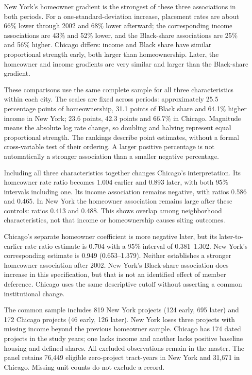 \documentclass[11pt]{article}
\begin{document}
New York's homeowner gradient is the strongest of these three associations in
both periods. For a one-standard-deviation increase, placement rates are about
66\% lower through 2002 and 68\% lower afterward; the corresponding income
associations are 43\% and 52\% lower, and the Black-share associations are 25\%
and 56\% higher. Chicago differs: income and Black share have similar proportional
strength early, both larger than homeownership. Later, the homeowner and income
gradients are very similar and larger than the Black-share gradient.



These comparisons use the same complete sample for all three characteristics
within each city. The scales are fixed across periods: approximately 25.5 percentage
points of homeownership, 31.1 points of Black share and 64.1\% higher income in
New York; 23.6 points, 42.3 points and 66.7\% in Chicago. Magnitude means the
absolute log rate change, so doubling and halving represent equal proportional
strength. The rankings describe point estimates, without a formal cross-variable
test of their ordering. A larger positive percentage is not automatically a
stronger association than a smaller negative percentage.

Including all three characteristics together changes Chicago's interpretation.
Its homeowner rate ratio becomes 1.004 earlier and 0.893 later, with both 95\%
intervals including one. Its income association remains negative, with ratios
0.586 and 0.465. In New York the homeowner association remains large after these
controls: ratios 0.413 and 0.488. This shows overlap among neighborhood
characteristics, not that income or homeownership causes siting outcomes.

Chicago's separate homeowner coefficient is more negative later, but its
later-to-earlier rate-ratio estimate is 0.704 with a 95\% interval of
0.381--1.302. New York's corresponding estimate is 0.949 (0.653--1.379).
Neither establishes a stronger homeowner association after 2002. New York's
Black-share association does increase in this specification, but that is not
an identified effect of member deference. Chicago uses the same descriptive
cutoff without asserting a common institutional change.

The common sample includes 819 New York projects (124 early, 695 later) and
172 Chicago projects (46 early, 126 later). New York loses three projects with
missing income beyond the previous homeowner sample. Chicago has 174 dated
projects in the study years; one lacks income and another lacks positive baseline
housing and defined shares. All excluded observations remain in the master.
The panel retains 76,449 eligible zero-project tract-years in New York and 31,671
in Chicago. Missing unit counts do not exclude a record.
\end{document}
